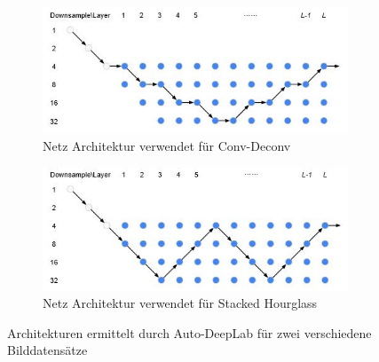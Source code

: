\begin{figure}[H]
	\centering
	\begin{subfigure}[b]{0.47\textwidth}
		\includegraphics[width=\textwidth]{Pictures/AutoDeepLab/Autodeeplab2.jpg}
		\caption{Netz Architektur verwendet für Conv-Deconv \cite{conv_deconv} }
		\label{pic:autodeeplabBsp1}
	\end{subfigure} \hfill
	\begin{subfigure}[b]{0.47\textwidth}
		\includegraphics[width=\textwidth]{Pictures/AutoDeepLab/Autodeeplab3.jpg}
		\caption{Netz Architektur verwendet für Stacked Hourglass \cite{stacked_hourglass}}
		\label{pic:autodeeplabBsp2}
	\end{subfigure}
	\caption{Architekturen ermittelt durch Auto-DeepLab für zwei verschiedene Bilddatensätze \cite{autodeeplabPaper} }
\end{figure}


